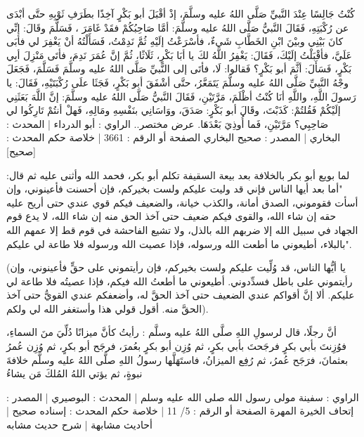 كُنْتُ جَالِسًا عِنْدَ النَّبيِّ صَلَّى اللهُ عليه وسلَّمَ، إذْ أقْبَلَ أبو بَكْرٍ آخِذًا بطَرَفِ ثَوْبِهِ حتَّى أبْدَى عن رُكْبَتِهِ، فَقَالَ النَّبيُّ صَلَّى اللهُ عليه وسلَّمَ: أمَّا صَاحِبُكُمْ فقَدْ غَامَرَ ، فَسَلَّمَ وقَالَ: إنِّي كانَ بَيْنِي وبيْنَ ابْنِ الخَطَّابِ شَيءٌ، فأسْرَعْتُ إلَيْهِ ثُمَّ نَدِمْتُ، فَسَأَلْتُهُ أنْ يَغْفِرَ لي فأبَى عَلَيَّ، فأقْبَلْتُ إلَيْكَ، فَقَالَ: يَغْفِرُ اللَّهُ لكَ يا أبَا بَكْرٍ، ثَلَاثًا، ثُمَّ إنَّ عُمَرَ نَدِمَ، فأتَى مَنْزِلَ أبِي بَكْرٍ، فَسَأَلَ: أثَّمَ أبو بَكْرٍ؟ فَقالوا: لَا، فأتَى إلى النَّبيِّ صَلَّى اللهُ عليه وسلَّمَ فَسَلَّمَ، فَجَعَلَ وجْهُ النَّبيِّ صَلَّى اللهُ عليه وسلَّمَ يَتَمَعَّرُ، حتَّى أشْفَقَ أبو بَكْرٍ، فَجَثَا علَى رُكْبَتَيْهِ، فَقَالَ: يا رَسولَ اللَّهِ، واللَّهِ أنَا كُنْتُ أظْلَمَ، مَرَّتَيْنِ، فَقَالَ النَّبيُّ صَلَّى اللهُ عليه وسلَّمَ: إنَّ اللَّهَ بَعَثَنِي إلَيْكُمْ فَقُلتُمْ: كَذَبْتَ، وقَالَ أبو بَكْرٍ: صَدَقَ، ووَاسَانِي بنَفْسِهِ ومَالِهِ، فَهلْ أنتُمْ تَارِكُوا لي صَاحِبِي؟ مَرَّتَيْنِ، فَما أُوذِيَ بَعْدَهَا.
عرض مختصر..
الراوي : أبو الدرداء | المحدث : البخاري | المصدر : صحيح البخاري
الصفحة أو الرقم : 3661 | خلاصة حكم المحدث : [صحيح]

لما بويع أبو بكر بالخلافة بعد بيعة السقيفة تكلم أبو بكر، فحمد الله وأثنى عليه ثم قال:
"أما بعد أيها الناس فإني قد وليت عليكم ولست بخيركم، فإن أحسنت فأعينوني، وإن أسأت فقوموني، الصدق أمانة، والكذب خيانة، والضعيف فيكم قوي عندي حتى أريح عليه حقه إن شاء الله، والقوى فيكم ضعيف حتى آخذ الحق منه إن شاء الله، لا يدع قوم الجهاد في سبيل الله إلا ضربهم الله بالذل، ولا تشيع الفاحشة في قوم قط إلا عمهم الله بالبلاء، أطيعوني ما أطعت الله ورسوله، فإذا عصيت الله ورسوله فلا طاعة لي عليكم".

(يا أيُّها الناس، قد وُلِّيت عليكم ولست بخيركم، فإن رأيتموني على حقٍّ فأعينوني، وإن رأيتموني على باطل فسدِّدوني. أطيعوني ما أطعتُ الله فيكم، فإذا عصيتُه فلا طاعة لي عليكم. ألا إنَّ أقواكم عندي الضعيف حتى آخذ الحقَّ له، وأضعفكم عندي القويُّ حتى آخذ الحقَّ منه. أقول قولي هذا وأستغفر الله لي ولكم).

أنَّ رجلًا، قال لرسولِ اللهِ صلَّى اللهُ عليه وسلَّم : رأيتُ كأنَّ ميزانًا دُلِّيَ منَ السماءِ، فوُزِنتَ بأبي بكرٍ فرجَحتَ بأبي بكرٍ، ثم وُزِن أبو بكرٍ بعُمرَ، فرجَح أبو بكرٍ، ثم وُزِن عُمرُ بعثمانَ، فرَجَح عُمرُ، ثم رُفِع الميزانُ، فاستَهَلَّها رسولُ اللهِ صلَّى اللهُ عليه وسلَّم خلافةَ نبوةٍ، ثم يؤتي اللهُ المُلكَ مَن يشاءُ

الراوي : سفينة مولى رسول الله صلى الله عليه وسلم | المحدث : البوصيري | المصدر : إتحاف الخيرة المهرة
الصفحة أو الرقم : 5/ 11 | خلاصة حكم المحدث : إسناده صحيح | أحاديث مشابهة | شرح حديث مشابه

